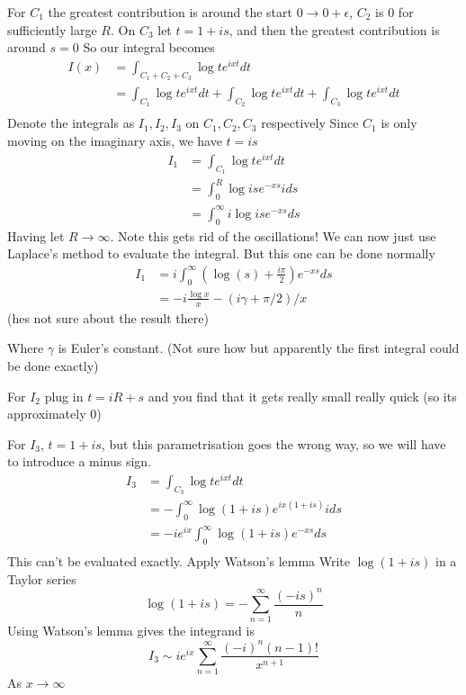 \documentclass{X:/Documents/Coding/Latex/myassignment}
\begin{document}
For $C_1$ the greatest contribution is around the start $0\to 0+\epsilon$, $C_2$ is $0$ for sufficiently large $R$.
On $C_3$ let $t= 1 + is$, and then the greatest contribution is around $s=0$ 
So our integral becomes
\begin{align*}
I(x) &= \int_{C_1+C_2+C_3} \log t e^{ixt} dt\\
&= \int_{C_1} \log t e^{ixt}dt + \int_{C_2} \log t e^{ixt}dt + \int_{C_3} \log t e^{ixt}dt\\
\end{align*}
Denote the integrals as $I_1,I_2,I_3$ on $C_1,C_2,C_3$ respectively
Since $C_1$ is only moving on the imaginary axis, we have $t=is$
\begin{align*}
    I_1 &= \int_{C_1} \log t e^{ixt} dt\\
    &= \int_0^R \log is e^{-xs} ids\\
    &= \int_0^\infty i\log is e^{-xs}  ds
\end{align*}
Having let $R\to\infty$. Note this gets rid of the oscillations! We can now just use Laplace's method to evaluate the integral. But this one can be done normally
\begin{align*}
    I_1 &=i\int_0^\infty \left(\log(s) + \frac{i\pi}{2}\right) e^{-xs} ds\\
    &=-i\frac{\log x}{x} - (i\gamma + \pi/2)/x
\end{align*}
(hes not sure about the result there)

Where $\gamma$ is Euler's constant.
(Not sure how but apparently the first integral could be done exactly)

For $I_2$ plug in $t=iR+s$ and you find that it gets really small really quick (so its approximately $0$)

For $I_3$, $t=1+is$, but this parametrisation goes the wrong way, so we will have to introduce a minus sign.
\begin{align*}
    I_3 &= \int_{C_3} \log t e^{ixt} dt\\
    &= -\int_{0}^{\infty}\log (1+is) e^{ix(1+is)}ids\\
    &= -ie^{ix}\int_{0}^{\infty}\log (1+is) e^{-xs}ds\\
\end{align*}
This can't be evaluated exactly. Apply Watson's lemma
Write $\log(1+is)$ in a Taylor series
\[\log(1+is) = -\sum_{n=1}^\infty \frac{(-is)^n}{n}\]
Using Watson's lemma gives the integrand is 
\[I_3 \sim ie^{ix} \sum_{n=1}^\infty \frac{(-i)^n (n-1)!}{x^{n+1}}\]
As $x\to\infty$
\end{document}
